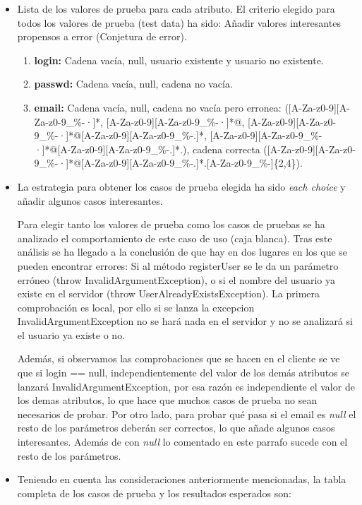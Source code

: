 \begin{itemize}
\item Lista de los valores de prueba para cada atributo.
El criterio elegido para todos los valores de prueba (test data) ha sido: Añadir valores interesantes propensos a error (Conjetura de error). 
	\begin{enumerate}
	\item {\bf login:}  Cadena vacía, null, usuario existente y usuario no existente. 
	\item {\bf passwd:} Cadena vacía, null, cadena no vacía. 
	\item {\bf email:} Cadena vacía, null, cadena no vacía pero erronea: ([A-Za-z0-9][A-Za-z0-9\_\%-·]*, [A-Za-z0-9][A-Za-z0-9\_\%-·]*@, [A-Za-z0-9][A-Za-z0-9\_\%-·]*@[A-Za-z0-9][A-Za-z0-9\_\%-.]*, [A-Za-z0-9][A-Za-z0-9\_\%-·]*@[A-Za-z0-9][A-Za-z0-9\_\%-.]*.), cadena correcta ([A-Za-z0-9][A-Za-z0-9\_\%-·]*@[A-Za-z0-9][A-Za-z0-9\_\%-.]*.[A-Za-z0-9\_\%-]\{2,4\}). 	
\end{enumerate}
\item La estrategia para obtener los casos de prueba elegida ha sido \textit{each choice} y añadir algunos casos interesantes.

Para elegir tanto los valores de prueba como los casos de pruebas se ha analizado el comportamiento de este caso de uso (caja blanca). Tras este análisis se ha llegado a la conclusión de que hay en dos lugares en los que se pueden encontrar errores: Si al método registerUser se le da un parámetro erróneo (throw InvalidArgumentException), o si el nombre del usuario ya existe en el servidor (throw UserAlreadyExistsException). La primera comprobación es local, por ello si se lanza la excepcion InvalidArgumentException no se hará nada en el servidor y no se analizará si el usuario ya existe o no.

Además, si observamos las comprobaciones que se hacen en el cliente se ve que si login == null, independientemente del valor de los demás atributos se lanzará  InvalidArgumentException, por esa razón es independiente el valor de los demas atributos, lo que hace que muchos casos de prueba no sean necesarios de probar. Por otro lado, para probar qué pasa si el email es \textit{null} el resto de los parámetros deberán ser correctos, lo que añade algunos casos interesantes. Además de con \textit{null} lo comentado en este parrafo sucede con el resto de los parámetros. 


\item Teniendo en cuenta las consideraciones anteriormente mencionadas, la tabla completa de los casos de prueba y los  resultados esperados son:
\end{itemize}



